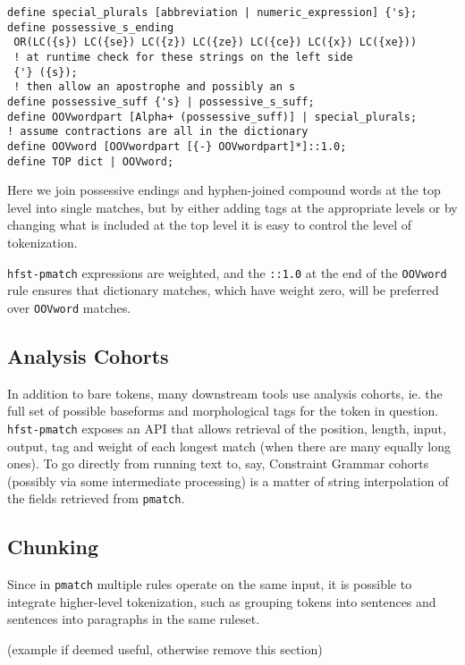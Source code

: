 \documentclass{llncs}
\begin{document}
\begin{framed}
\begin{verbatim}
define special_plurals [abbreviation | numeric_expression] {'s};
define possessive_s_ending
 OR(LC({s}) LC({se}) LC({z}) LC({ze}) LC({ce}) LC({x}) LC({xe}))
 ! at runtime check for these strings on the left side
 {'} ({s});
 ! then allow an apostrophe and possibly an s 
define possessive_suff {'s} | possessive_s_suff;
define OOVwordpart [Alpha+ (possessive_suff)] | special_plurals;
! assume contractions are all in the dictionary
define OOVword [OOVwordpart [{-} OOVwordpart]*]::1.0;
define TOP dict | OOVword;
\end{verbatim}
\end{framed}

Here we join possessive endings and hyphen-joined compound words at the top
level into single matches, but by either adding tags at the appropriate levels
or by changing what is included at the top level it is easy to control the
level of tokenization.

\verb+hfst-pmatch+ expressions are weighted, and the \verb+::1.0+ at the end
of the \verb+OOVword+ rule ensures that dictionary matches, which have
weight zero, will be preferred over \verb+OOVword+ matches.

\subsection{Analysis Cohorts}

In addition to bare tokens, many downstream tools use analysis cohorts, ie.\@
the full set of possible baseforms and morphological tags for the token in
question. \verb+hfst-pmatch+ exposes an API that allows retrieval of the
position, length, input, output, tag and weight of each longest match (when
there are many equally long ones). To go directly from running text to, say,
Constraint Grammar cohorts (possibly via some intermediate processing) is a
matter of string interpolation of the fields retrieved from \verb+pmatch+.

\subsection{Chunking}

Since in \verb+pmatch+ multiple rules operate on the same input, it is possible
to integrate higher-level tokenization, such as grouping tokens into sentences
and sentences into paragraphs in the same ruleset.

(example if deemed useful, otherwise remove this section)
\end{document}
